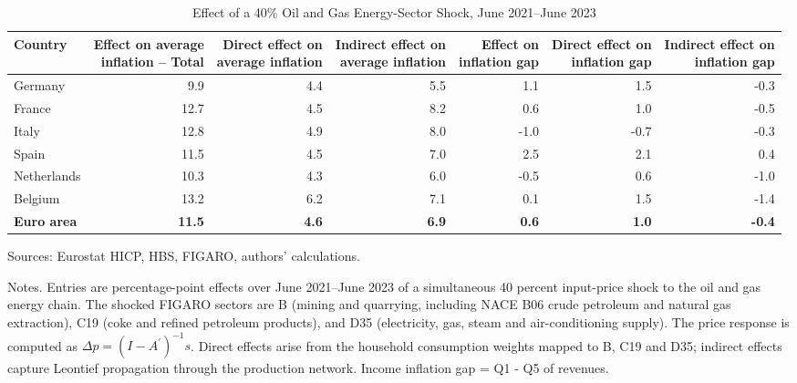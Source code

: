 \begin{table}[H]
\centering
\caption{Effect of a 40\% Oil and Gas Energy-Sector Shock, June 2021--June 2023}
\scriptsize
\setlength{\tabcolsep}{4.2pt}
\begin{tabular}{lrrrrrr}
\toprule
Country & \shortstack{Effect on average\\inflation -- Total} & \shortstack{Direct effect on\\average inflation} & \shortstack{Indirect effect on\\average inflation} & \shortstack{Effect on\\inflation gap} & \shortstack{Direct effect on\\inflation gap} & \shortstack{Indirect effect on\\inflation gap}
 \\
\midrule
Germany & 9.9 & 4.4 & 5.5 & 1.1 & 1.5 & -0.3
 \\
France & 12.7 & 4.5 & 8.2 & 0.6 & 1.0 & -0.5
 \\
Italy & 12.8 & 4.9 & 8.0 & -1.0 & -0.7 & -0.3
 \\
Spain & 11.5 & 4.5 & 7.0 & 2.5 & 2.1 & 0.4
 \\
Netherlands & 10.3 & 4.3 & 6.0 & -0.5 & 0.6 & -1.0
 \\
Belgium & 13.2 & 6.2 & 7.1 & 0.1 & 1.5 & -1.4
 \\
\midrule
\textbf{Euro area} & \textbf{11.5} & \textbf{4.6} & \textbf{6.9} & \textbf{0.6} & \textbf{1.0} & \textbf{-0.4}
 \\
\bottomrule
\end{tabular}
\par\vspace{0.35em}\footnotesize\noindent Sources: Eurostat HICP, HBS, FIGARO, authors' calculations.
\par\vspace{0.25em}\footnotesize\noindent Notes. Entries are percentage-point effects over June 2021--June 2023 of a simultaneous 40 percent input-price shock to the oil and gas energy chain. The shocked FIGARO sectors are B (mining and quarrying, including NACE B06 crude petroleum and natural gas extraction), C19 (coke and refined petroleum products), and D35 (electricity, gas, steam and air-conditioning supply). The price response is computed as $\Delta p = (I - A^{\prime})^{-1}s$. Direct effects arise from the household consumption weights mapped to B, C19 and D35; indirect effects capture Leontief propagation through the production network. Income inflation gap = Q1 - Q5 of revenues.
\end{table}
\vspace{0.6em}
